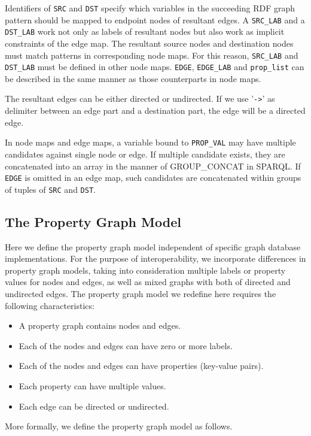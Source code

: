 \documentclass[runningheads]{llncs}
\begin{document}
 Identifiers of \texttt{SRC} and \texttt{DST} specify which variables in the succeeding RDF graph pattern should be mapped to endpoint nodes of resultant edges.
A \texttt{SRC\_LAB} and a \texttt{DST\_LAB} work not only as labels of resultant nodes but also work as implicit constraints of the edge map.
The resultant source nodes and destination nodes must match patterns in corresponding node maps.
For this reason, \texttt{SRC\_LAB} and \texttt{DST\_LAB} must be defined in other node maps.
\texttt{EDGE}, \texttt{EDGE\_LAB} and \texttt{prop\_list} can be described in the same manner as those counterparts in node maps.

The resultant edges can be either directed or undirected. If we use '\texttt{->}' as delimiter between an edge part and a destination part, the edge will be a directed edge.

In node maps and edge maps, a variable bound to \texttt{PROP\_VAL} may have multiple candidates against single node or edge. If multiple candidate exists, they are concatenated into an array in the manner of GROUP\_CONCAT in SPARQL. If \texttt{EDGE} is omitted in an edge map, such candidates are concatenated  within groups of tuples of \texttt{SRC} and \texttt{DST}.


\subsection{The Property Graph Model}
Here we define the property graph model independent of specific graph database implementations. For the purpose of interoperability, we incorporate differences in property graph models, taking into consideration multiple labels or property values for nodes and edges, as well as mixed graphs with both of directed and undirected edges. The property graph model we redefine here requires the following characteristics:

\begin{itemize}
    \item A property graph contains nodes and edges.
    \item Each of the nodes and edges can have zero or more labels.
    \item Each of the nodes and edges can have properties (key-value pairs).
    \item Each property can have multiple values.
    \item Each edge can be directed or undirected.
\end{itemize}
More formally, we define the property graph model as follows.
\end{document}
